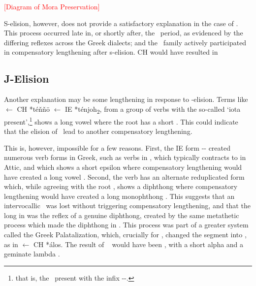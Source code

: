 \textcolor{red}{[Diagram of Mora Preservation]}

S-elision, however, does not provide a satisfactory explanation in the case of .
This process occurred late in, or shortly after, the \CH\ period, as evidenced by the differing
reflexes across the Greek dialects; and the \AI\ family actively participated in
compensatory lengthening after s-elision. CH  would have resulted
in \autocite[229]{Sihler_1995}

\subsection{J-Elision}\label{subsec:JElision}
Another explanation may be some lengthening in response to \textel{\yod}-elision. Terms like
 $\gets$ CH *t\'e\v{n}\v{n}\=o $\gets$ IE *t\'enjoh\textsubscript{2},\autocite[64; for the endings 
of IE second conjugation thematic verbs.]{mallory_adams_2009}
from a group of
verbs with the so-called `iota present',\footnote{that is, the \IE\ present with the infix -\textel{\yod}\eo-.}
shows a long vowel   where the root  has a short 
. This could indicate that the elision of \textel{\yod}\ lead to another
compensatory lengthening.

This is, however, impossible for a few reasons. First, the IE form -\textel{\yod}\eo- created
numerous verb forms in Greek, such as verbs in , which typically contracts to 
in Attic, and which shows a short epsilon  where compensatory lengthening
would have created a long vowel  . Second, the verb has
an alternate reduplicated form  which, while agreeing with the root ,
shows a diphthong   where compensatory lengthening would have created a long
monophthong  . This suggests that an intervocallic \textel{\yod}\ 
was lost
without triggering compensatory lengthening, and that the long   in 
was the reflex of a genuine diphthong, created by the same metathetic process which made the diphthong
in \textel{τιταίνω}. This process was part of a greater system called the Greek
Palatalization,\autocite[197]{Sihler_1995} which, crucially for , changed the segment
\textel{*λ\yod} into \textel{λλ}, as in \textel{ἄλλος} $\gets$ CH *\'al\textel{\yod}os. The result of
\CH\ \iform[L]{k\u{a}l\textel{\yod}\'os} would have been \iform[G]{κᾰλλός}, with a short alpha
\ortho{\textel{ᾰ}} and a geminate lambda \ortho{\textel{λλ}}.

